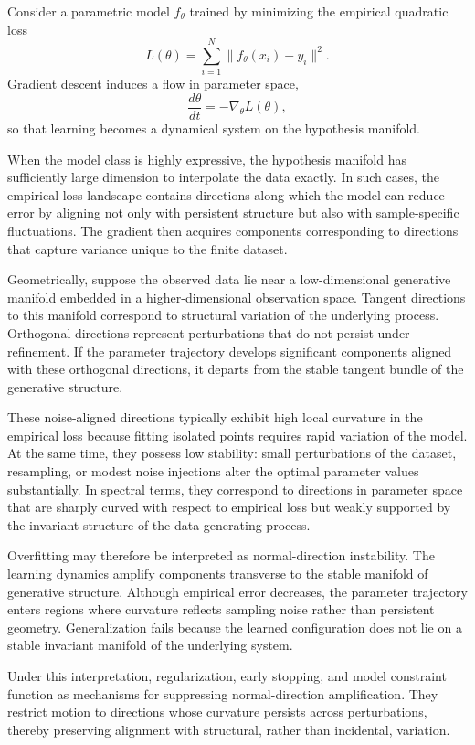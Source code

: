 \documentclass[12pt]{book}
\begin{document}
Consider a parametric model $f_\theta$ trained by minimizing the empirical quadratic loss
\[
L(\theta)
=
\sum_{i=1}^{N}
\| f_\theta(x_i) - y_i \|^2.
\]
Gradient descent induces a flow in parameter space,
\[
\frac{d\theta}{dt}
=
- \nabla_\theta L(\theta),
\]
so that learning becomes a dynamical system on the hypothesis manifold.

When the model class is highly expressive, the hypothesis manifold has sufficiently large dimension to interpolate the data exactly. In such cases, the empirical loss landscape contains directions along which the model can reduce error by aligning not only with persistent structure but also with sample-specific fluctuations. The gradient then acquires components corresponding to directions that capture variance unique to the finite dataset.

Geometrically, suppose the observed data lie near a low-dimensional generative manifold embedded in a higher-dimensional observation space. Tangent directions to this manifold correspond to structural variation of the underlying process. Orthogonal directions represent perturbations that do not persist under refinement. If the parameter trajectory develops significant components aligned with these orthogonal directions, it departs from the stable tangent bundle of the generative structure.

These noise-aligned directions typically exhibit high local curvature in the empirical loss because fitting isolated points requires rapid variation of the model. At the same time, they possess low stability: small perturbations of the dataset, resampling, or modest noise injections alter the optimal parameter values substantially. In spectral terms, they correspond to directions in parameter space that are sharply curved with respect to empirical loss but weakly supported by the invariant structure of the data-generating process.

Overfitting may therefore be interpreted as normal-direction instability. The learning dynamics amplify components transverse to the stable manifold of generative structure. Although empirical error decreases, the parameter trajectory enters regions where curvature reflects sampling noise rather than persistent geometry. Generalization fails because the learned configuration does not lie on a stable invariant manifold of the underlying system.

Under this interpretation, regularization, early stopping, and model constraint function as mechanisms for suppressing normal-direction amplification. They restrict motion to directions whose curvature persists across perturbations, thereby preserving alignment with structural, rather than incidental, variation.
\end{document}
